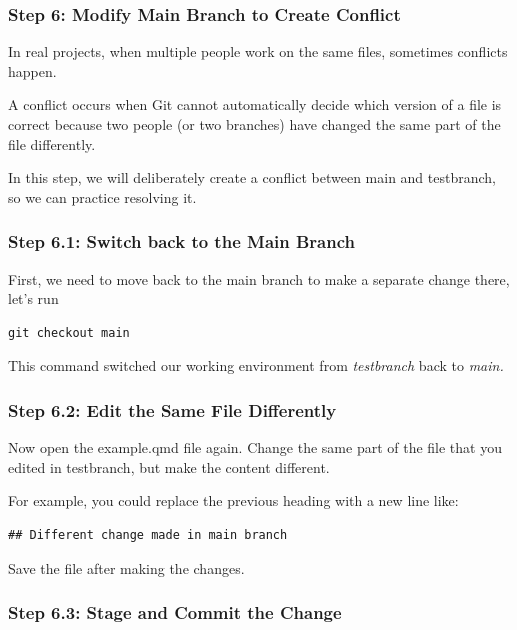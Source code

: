 \documentclass[
  11pt,
  a4paper,
]{article}
\begin{document}
\newpage

\subsubsection{Step 6: Modify Main Branch to Create
Conflict}\label{step-6-modify-main-branch-to-create-conflict}

In real projects, when multiple people work on the same files, sometimes
conflicts happen.

A conflict occurs when Git cannot automatically decide which version of
a file is correct because two people (or two branches) have changed the
same part of the file differently.

In this step, we will deliberately create a conflict between main and
testbranch, so we can practice resolving it.

\subsubsection{Step 6.1: Switch back to the Main
Branch}\label{step-6.1-switch-back-to-the-main-branch}

First, we need to move back to the main branch to make a separate change
there, let's run

\begin{verbatim}
git checkout main
\end{verbatim}

This command switched our working environment from \emph{testbranch}
back to \emph{main.}

\subsubsection{Step 6.2: Edit the Same File
Differently}\label{step-6.2-edit-the-same-file-differently}

Now open the example.qmd file again. Change the same part of the file
that you edited in testbranch, but make the content different.

For example, you could replace the previous heading with a new line
like:

\begin{verbatim}
## Different change made in main branch
\end{verbatim}

Save the file after making the changes.

\subsubsection{Step 6.3: Stage and Commit the
Change}\label{step-6.3-stage-and-commit-the-change}
\end{document}
